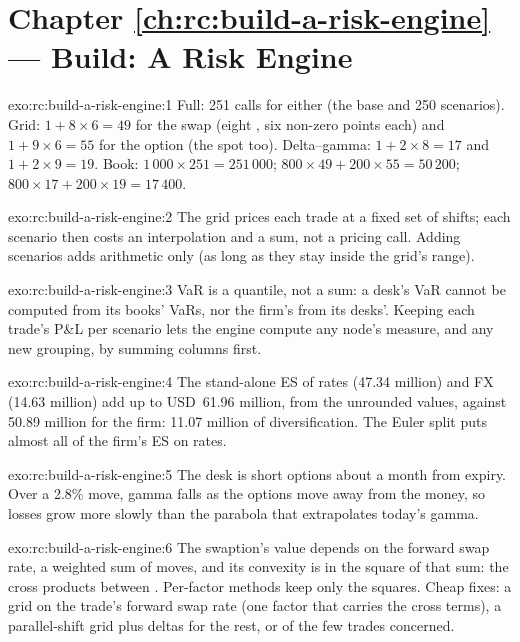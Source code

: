 \section*{Chapter \ref{ch:rc:build-a-risk-engine} --- Build: A Risk Engine}

\begin{solution}{exo:rc:build-a-risk-engine:1}
Full: 251 calls for either (the base and 250 scenarios). Grid: $1+8\times6=49$ for the swap (eight ,
six non-zero points each) and $1+9\times6=55$ for the option (the spot too). Delta--gamma: $1+2\times8=17$ and
$1+2\times9=19$. Book: $1\,000\times251=251\,000$; $800\times49+200\times55=50\,200$; $800\times17+200\times19=17\,400$.
\end{solution}

\begin{solution}{exo:rc:build-a-risk-engine:2}
The grid prices each trade at a fixed set of shifts; each scenario then costs an interpolation and a sum,
not a pricing call. Adding scenarios adds arithmetic only (as long as they stay inside the grid's range).
\end{solution}

\begin{solution}{exo:rc:build-a-risk-engine:3}
VaR is a quantile, not a sum: a desk's VaR cannot be computed from its books' VaRs, nor the firm's from its
desks'. Keeping each trade's P\&L per scenario lets the engine compute any node's measure, and any new
grouping, by summing columns first.
\end{solution}

\begin{solution}{exo:rc:build-a-risk-engine:4}
The stand-alone ES of rates (47.34 million) and FX (14.63 million) add up to USD~61.96 million, from the unrounded values, against 50.89 million for the firm: 11.07
million of diversification. The Euler split puts almost all of the firm's ES on rates.
\end{solution}

\begin{solution}{exo:rc:build-a-risk-engine:5}
The desk is short options about a month from expiry. Over a 2.8\% move, gamma falls as the options move away
from the money, so losses grow more slowly than the parabola that extrapolates today's gamma.
\end{solution}

\begin{solution}{exo:rc:build-a-risk-engine:6}
The swaption's value depends on the forward swap rate, a weighted sum of  moves, and its convexity is in
the square of that sum: the cross products between . Per-factor methods keep only the squares.
Cheap fixes: a grid on the trade's forward swap rate (one factor that carries the cross terms), a
parallel-shift grid plus  deltas for the rest, or  of the few trades concerned.
\end{solution}

